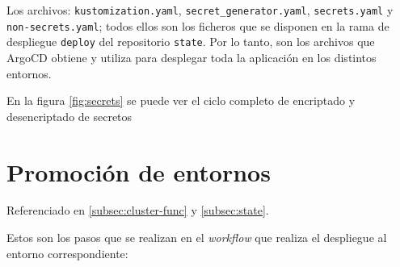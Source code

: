 Los archivos: \texttt{kustomization.yaml}, \texttt{secret\_generator.yaml}, \texttt{secrets.yaml} y \texttt{non-secrets.yaml}; todos ellos son los ficheros que se disponen en la rama de despliegue \texttt{deploy} del repositorio \texttt{state}. Por lo tanto, son los archivos que ArgoCD obtiene y utiliza para desplegar toda la aplicación en los distintos entornos.

En la figura \ref{fig:secrets} se puede ver el ciclo completo de encriptado y desencriptado de secretos

\section{Promoción de entornos}
\label{sec:promotion}

Referenciado en \ref{subsec:cluster-func} y \ref{subsec:state}.

Estos son los pasos que se realizan en el \textit{workflow} que realiza el despliegue al entorno correspondiente:

